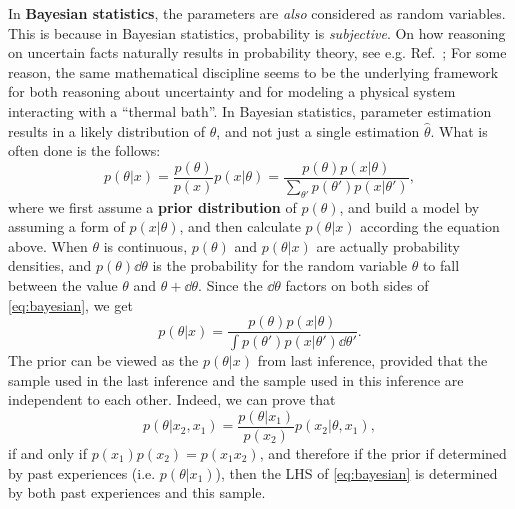 \documentclass[hyperref, a4paper, 12pt]{report}
\newcommand*{\concept}[1]{{\textbf{#1}}}
\begin{document}
In \concept{Bayesian statistics}, the parameters are \emph{also} considered as random variables.
This is because in Bayesian statistics, probability is \emph{subjective}.
On how reasoning on uncertain facts naturally results in probability theory, see e.g. Ref.~\cite{jaynes2003probability};
For some reason, the same mathematical discipline seems to be the underlying framework for both reasoning about uncertainty and for modeling a physical system interacting with a ``thermal bath''.
In Bayesian statistics, parameter estimation results in a likely distribution of $\theta$,
and not just a single estimation $\hat{\theta}$.
What is often done is the follows:
\begin{equation}
    p(\theta | x) = \frac{p(\theta)}{p(x)} p(x | \theta) = \frac{p(\theta) p(x | \theta)}{\sum_{\theta'} p(\theta') p(x | \theta')},
    \label{eq:bayesian}
\end{equation}
where we first assume a \concept{prior distribution} of $p(\theta)$,
and build a model by assuming a form of $p(x | \theta)$,
and then calculate $p(\theta | x)$ according the equation above.
When $\theta$ is continuous, $p(\theta)$ and $p(\theta | x)$ are actually probability densities,
and $p(\theta) \dd{\theta}$ is the probability for the random variable $\theta$ to fall between the value $\theta$ and $\theta + \dd{\theta}$.
Since the $\dd{\theta}$ factors on both sides of \eqref{eq:bayesian}, we get 
\begin{equation}
    p(\theta | x) = \frac{p(\theta) p(x | \theta)}{\int p(\theta') p(x | \theta') \dd{\theta'}}.
\end{equation}
The prior can be viewed as the $p(\theta | x)$ from last inference,
provided that the sample used in the last inference and the sample used in this inference
are independent to each other.
Indeed, we can prove that 
\begin{equation}
    p(\theta | x_2, x_1) = \frac{p(\theta | x_1)}{p(x_2)} p(x_2 | \theta, x_1),
\end{equation}
if and only if $p(x_1) p(x_2) = p(x_1 x_2)$,
and therefore if the prior if determined by past experiences (i.e. $p(\theta | x_1)$),
then the LHS of \eqref{eq:bayesian} is determined by both past experiences and this sample.
\end{document}
